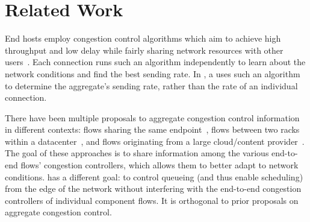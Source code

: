 \section{Related Work}
\label{s:related}


End hosts employ congestion control algorithms which aim to achieve high throughput and low delay while fairly sharing network resources with other users~\cite{Jacobson88}. 
Each connection runs such an algorithm independently to learn about the network conditions and find the best sending rate.
In \name, a \inbox uses such an algorithm to determine the aggregate's sending rate, rather than the rate of an individual connection.

There have been multiple proposals to aggregate congestion control information in different contexts: flows sharing the same endpoint~\cite{cm}, flows between two racks within a datacenter~\cite{rackcc}, and flows originating from a large cloud/content provider~\cite{fivecomps}. 
The goal of these approaches is to share information among the various end-to-end flows' congestion controllers, which allows them to better adapt to network conditions. 
\name has a different goal: to control queueing (and thus enable scheduling) from the edge of the network without interfering with the end-to-end congestion controllers of individual component flows. It is orthogonal to prior proposals on aggregate congestion control.

